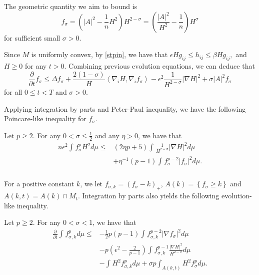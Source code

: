 The geometric quantity we aim to bound is 
\[f_\sigma = \left( \left| A \right| ^2-\frac{1}{n}H^2 \right) H^{2-\sigma} = \left( \frac{\left| A \right| ^2}{H^2}-\frac{1}{n} \right) H^{\sigma} \]
for sufficient small $\sigma >0$.

Since $M$ is uniformly convex, by \autoref{stpin}, we have that $\epsilon H g_{ij }^{} \leq h_{ij }^{} \leq \beta H g_{ij }^{} ,$ and $H \geq 0$ for any $t>0$.  Combining previous evolution equations, we can deduce that
\begin{equation} \label{evof}
    \frac{\partial }{\partial t} f_\sigma \leq \Delta f_\sigma + \frac{2(1-\sigma )}{H}\left\langle \nabla _i H, \nabla_{i}^{} f_\sigma  \right\rangle - \epsilon ^2 \frac{1}{H^{2-\sigma }}\left| \nabla H \right| ^2+\sigma \left| A \right| ^2 f_\sigma
\end{equation}
for all $0 \leq t < T$ and $\sigma >0$. 

Applying integration by parts and Peter-Paul inequality, we have the following Poincare-like inequality for $f_\sigma $.

\begin{lemma}
    Let $p \geq 2$. For any $0 < \sigma \leq \frac{1}{2}$ and any $\eta >0$, we have that 
    \begin{equation}
    \begin{split}
        n \epsilon ^2 \int_{}^{}f_{\sigma }^{p} H^2d \mu \leq& \left( 2 \eta p+5 \right) \int_{}^{}\frac{1}{H^{2-\sigma }}\left| \nabla H \right| ^2 d \mu  \\
    &+ \eta ^{-1}\left( p-1 \right) \int_{}^{}f_{\sigma }^{p-2} \left| f_{\sigma }^{}  \right| ^2 d \mu .  \\
    \end{split}
    \end{equation} 
\end{lemma}

For a positive constant $k$, we let $f_{\sigma ,k}^{} =(f_{\sigma }^{} -k)_+$, $A(k)=\left\{ f_{\sigma }^{} \geq k \right\} $ and $A(k,t)=A(k)\cap M_t.$ Integration by parts also yields the following evolution-like inequality.

\begin{lemma}
    Let $p \geq 2$. For any $0<\sigma <1 $, we have that 
    \begin{equation}
        \begin{split}
            \frac{\partial }{\partial t}\int_{}^{}f_{\sigma,k }^{p} d \mu 
        \leq&  -\frac{1}{2} p(p-1) \int_{}^{} f_{\sigma ,k}^{p-2} \left| \nabla f_{\sigma }^{}  \right| ^2 d \mu\\
        & -p\left( \epsilon ^2-\frac{2}{p-1} \right)\int_{}^{} f_{\sigma ,k}^{p-1} \frac{\left| \nabla H \right| ^2}{H^{2-\sigma }} d \mu  \\
        & - \int_{}^{}H^2 f_{\sigma,k }^{p} d \mu +\sigma p \int_{A(k,t)}^{} H ^2  f_{\sigma }^{p} d \mu .
        \end{split}
        \end{equation} 
\end{lemma}

